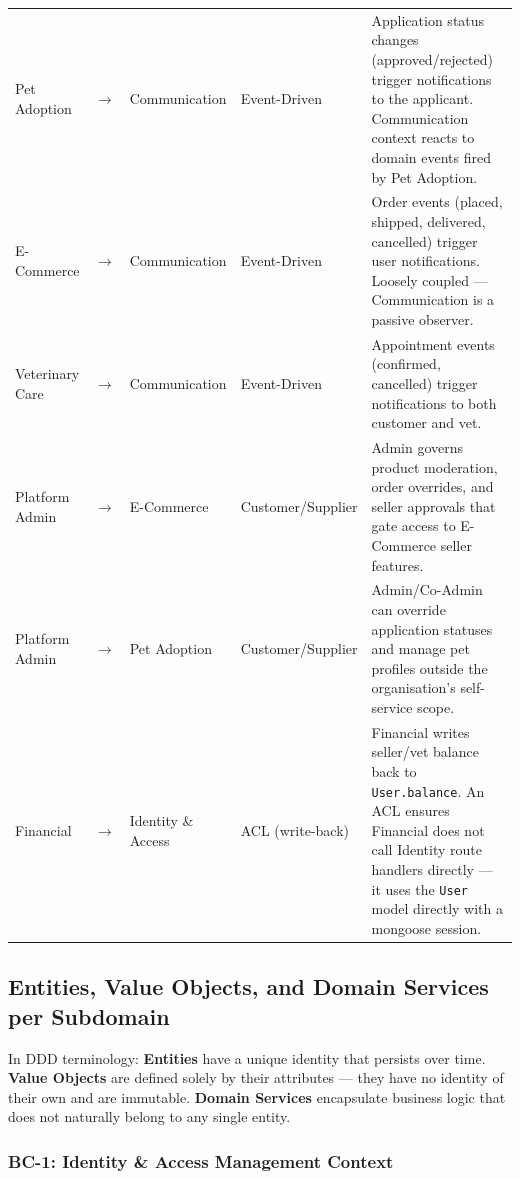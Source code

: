 \documentclass[12pt,a4paper]{article}
\begin{document}
\begin{longtable}{@{}p{3.2cm}p{0.5cm}p{3.2cm}p{2.2cm}p{5.2cm}@{}}
Pet Adoption & $\rightarrow$ & Communication & Event-Driven & Application status changes (approved/rejected) trigger notifications to the applicant. Communication context reacts to domain events fired by Pet Adoption. \\[4pt]
E-Commerce & $\rightarrow$ & Communication & Event-Driven & Order events (placed, shipped, delivered, cancelled) trigger user notifications. Loosely coupled — Communication is a passive observer. \\[4pt]
Veterinary Care & $\rightarrow$ & Communication & Event-Driven & Appointment events (confirmed, cancelled) trigger notifications to both customer and vet. \\[4pt]
Platform Admin & $\rightarrow$ & E-Commerce & Customer/Supplier & Admin governs product moderation, order overrides, and seller approvals that gate access to E-Commerce seller features. \\[4pt]
Platform Admin & $\rightarrow$ & Pet Adoption & Customer/Supplier & Admin/Co-Admin can override application statuses and manage pet profiles outside the organisation's self-service scope. \\[4pt]
Financial & $\rightarrow$ & Identity \& Access & ACL (write-back) & Financial writes seller/vet balance back to \texttt{User.balance}. An ACL ensures Financial does not call Identity route handlers directly — it uses the \texttt{User} model directly with a mongoose session. \\[4pt]
\end{longtable}

\newpage

\subsection{Entities, Value Objects, and Domain Services per Subdomain}

In DDD terminology: \textbf{Entities} have a unique identity that persists over time. \textbf{Value Objects} are defined solely by their attributes — they have no identity of their own and are immutable. \textbf{Domain Services} encapsulate business logic that does not naturally belong to any single entity.

\subsubsection{BC-1: Identity \& Access Management Context}
\end{document}
